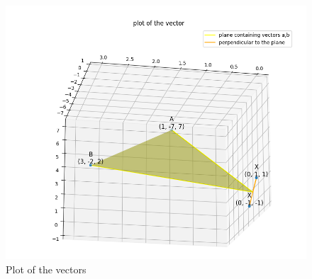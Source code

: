 \documentclass[journal]{IEEEtran}
\begin{document}
\begin{figure}[h!]
   \centering
   \includegraphics[width = 1\linewidth]{figs/fig.png}
   \caption{Plot of the vectors}
   \label{stemplot}
\end{figure}
\end{document}
